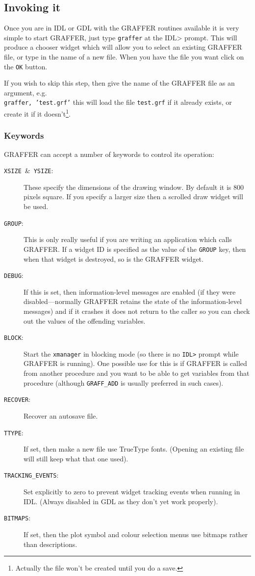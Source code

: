 \documentclass[11pt,twoside,english]{article}
\begin{document}
\subsection{Invoking it}

Once you are in IDL or GDL with the GRAFFER routines available it is very
simple to start GRAFFER, just type \texttt{graffer} at the IDL> prompt.
This will produce a chooser widget which will allow you to select an
existing GRAFFER file, or type in the name of a new file. When you have
the file you want click on the \texttt{OK} button.

If you wish to skip this step, then give the name of the GRAFFER file
as an argument, e.g. \texttt{}~\\
\texttt{graffer,~'test.grf'} this will load the file \texttt{test.grf}
if it already exists, or create it if it doesn't\footnote{Actually the
  file won't be created until you do a save.}.


\subsubsection{Keywords}

GRAFFER can accept a number of keywords to control its operation:

\begin{description}

\item [\texttt{XSIZE}~\&~\texttt{YSIZE}:]These specify the dimensions
  of the drawing window. By default it is 800 pixels square. If you
  specify a larger size then a scrolled draw widget will be used.
\item [\texttt{GROUP}:]This is only really useful if you are writing an
  application which calls GRAFFER. If a widget ID is specified as the
  value of the \texttt{GROUP} key, then when that widget is destroyed,
  so is the GRAFFER widget.
\item [\texttt{DEBUG}:]If this is set, then information-level messages
  are enabled (if they were disabled---normally GRAFFER retains the
  state of the information-level messages) and if it crashes it does
  not return to the caller so you can check out the values of the
  offending variables.
\item[\texttt{BLOCK}:] Start the \texttt{xmanager} in blocking mode (so
  there is no \texttt{IDL>} prompt while GRAFFER is running). One
  possible use for this is if GRAFFER is called from another procedure
  and you want to be able to get variables from that procedure
  (although \texttt{GRAFF\_ADD} is usually preferred in such cases).
\item[\texttt{RECOVER}:] Recover an autosave file.
\item[\texttt{TTYPE}:] If set, then make a new file use TrueType
  fonts. (Opening an existing file will still keep what that one used).
\item[\texttt{TRACKING\_EVENTS}:] Set explicitly to zero to prevent
  widget tracking events when running in IDL. (Always disabled in GDL
  as they don't yet work properly).
\item[\texttt{BITMAPS}:] If set, then the plot symbol and colour
  selection menus use bitmaps rather than descriptions.
\end{description}
\end{document}
